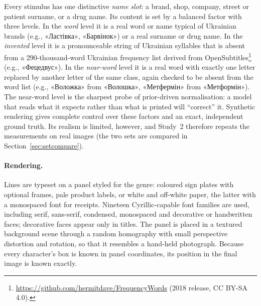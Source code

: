 \documentclass[pdflatex,sn-mathphys-num]{sn-jnl}%
\theoremstyle{thmstyleone}%
\theoremstyle{thmstyletwo}%
\theoremstyle{thmstylethree}%
\begin{document}
Every stimulus has one distinctive \emph{name slot}: a brand, shop, company, street or patient surname, or a drug name. Its content is set by a balanced factor with three levels. In the \emph{word} level it is a real word or name typical of Ukrainian brands (e.g., \foreignlanguage{ukrainian}{«Ластівка»}, \foreignlanguage{ukrainian}{«Барвінок»}) or a real surname or drug name. In the \emph{invented} level it is a pronounceable string of Ukrainian syllables that is absent from a 290-thousand-word Ukrainian frequency list derived from OpenSubtitles\footnote{\url{https://github.com/hermitdave/FrequencyWords} (2018 release, CC BY-SA 4.0).} (e.g., \foreignlanguage{ukrainian}{«Фецедвус»}). In the \emph{near-word} level it is a real word with exactly one letter replaced by another letter of the same class, again checked to be absent from the word list (e.g., \foreignlanguage{ukrainian}{«Воложка»} from \foreignlanguage{ukrainian}{«Волошка»}, \foreignlanguage{ukrainian}{«Метфермін»} from \foreignlanguage{ukrainian}{«Метформін»}). The near-word level is the sharpest probe of prior-driven normalisation: a model that reads what it expects rather than what is printed will ``correct'' it. Synthetic rendering gives complete control over these factors and an exact, independent ground truth. Its realism is limited, however, and Study~2 therefore repeats the measurements on real images (the two sets are compared in Section~\ref{sec:setcompare}).

\paragraph{Rendering.} Lines are typeset on a panel styled for the genre: coloured sign plates with optional frames, pale product labels, or white and off-white paper, the latter with a monospaced font for receipts. Nineteen Cyrillic-capable font families are used, including serif, sans-serif, condensed, monospaced and decorative or handwritten faces; decorative faces appear only in titles. The panel is placed in a textured background scene through a random homography with small perspective distortion and rotation, so that it resembles a hand-held photograph. Because every character's box is known in panel coordinates, its position in the final image is known exactly.
\end{document}
